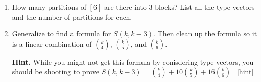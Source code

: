 \documentclass{book}
\begin{document}
\setcounter{project}{275}
\addtocounter{project}{-1}
\begin{activity}[]\label{activity-268}
\leavevmode%
\begin{enumerate}[font=\bfseries,label=(\alph*),ref=\alph*]
\item\label{task-261} \hypertarget{p-1426}{}%
How many partitions of \([6]\) are there into 3 blocks?  List all the type vectors and the number of partitions for each.%
\item\label{task-262} \hypertarget{p-1427}{}%
Generalize to find a formula for \(S(k,k-3)\).  Then clean up the formula so it is a linear combination of \(\binom{k}{4}\), \(\binom{k}{5}\), and \(\binom{k}{6}\).%
\par\smallskip%
\noindent\textbf{Hint.}\hypertarget{hint-179}{}\quad%
\hypertarget{p-1428}{}%
While you might not get this formula by conisdering type vectors, you should be shooting to prove \(S(k, k-3) = \binom{k}{4} + 10 \binom{k}{5} + 16 \binom{k}{6}\)%
~\hfill{\tiny\hyperlink{a-275.b}{[hint]}\hypertarget{q-275.b}{}}\end{enumerate}
\end{activity}

\clearpage
\end{document}
